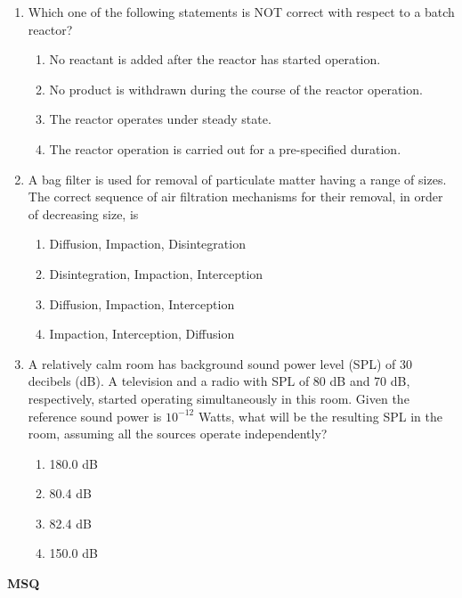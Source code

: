 \documentclass[12pt,a4paper]{article}
\begin{document}
\begin{enumerate}
   \item Which one of the following statements is NOT correct with respect to a batch reactor?
         \begin{enumerate}
            \item No reactant is added after the reactor has started operation.
            \item No product is withdrawn during the course of the reactor operation.
            \item The reactor operates under steady state.
            \item The reactor operation is carried out for a pre-specified duration.
         \end{enumerate}

   \item A bag filter is used for removal of particulate matter having a range of sizes. The correct sequence of air filtration mechanisms for their removal, in order of decreasing size, is
         \begin{enumerate}
            \item Diffusion, Impaction, Disintegration
            \item Disintegration, Impaction, Interception
            \item Diffusion, Impaction, Interception
            \item Impaction, Interception, Diffusion
         \end{enumerate}

   \item A relatively calm room has background sound power level (SPL) of 30 decibels (dB). A television and a radio with SPL of 80 dB and 70 dB, respectively, started operating simultaneously in this room. Given the reference sound power is $10^{-12}$ Watts, what will be the resulting SPL in the room, assuming all the sources operate independently?
         \begin{enumerate}
            \item 180.0 dB
            \item 80.4 dB
            \item 82.4 dB
            \item 150.0 dB
         \end{enumerate}
\end{enumerate}
\textbf{MSQ}
\end{document}
